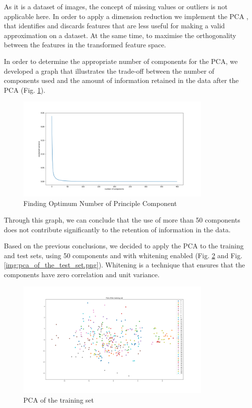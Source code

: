 \documentclass[conference]{IEEEtran}
\begin{document}
As it is a dataset of images, the concept of missing values or outliers is not applicable here. In order to apply a dimension reduction we implement the PCA \cite{pca}, that identifies and discards features that are less useful for making a valid approximation on a dataset. At the same time, to maximise the orthogonality between the features in the transformed feature space.

In order to determine the appropriate number of components for the PCA, we developed a graph that illustrates the trade-off between the number of components used and the amount of information retained in the data after the PCA (Fig. \ref{img:number_of_components_vs_explained_variance.png}).

\begin{figure}[!h]
    \centering
    \includegraphics[width=3.8in]{number_of_components_vs_explained_variance.png}
    \caption{Finding Optimum Number of Principle Component}
    \label{img:number_of_components_vs_explained_variance.png}
\end{figure}

Through this graph, we can conclude that the use of more than 50 components does not contribute significantly to the retention of information in the data.

Based on the previous conclusions, we decided to apply the PCA to the training and test sets, using 50 components and with whitening enabled (Fig. \ref{img:pca_of_the_training_set.png} and Fig. \ref{img:pca_of_the_test_set.png}). Whitening is a technique that ensures that the components have zero correlation and unit variance.

\begin{figure}[!h]
    \centering
    \includegraphics[width=3.8in]{pca_of_the_training_set.png}
    \caption{PCA of the training set}
    \label{img:pca_of_the_training_set.png}
\end{figure}
\end{document}
